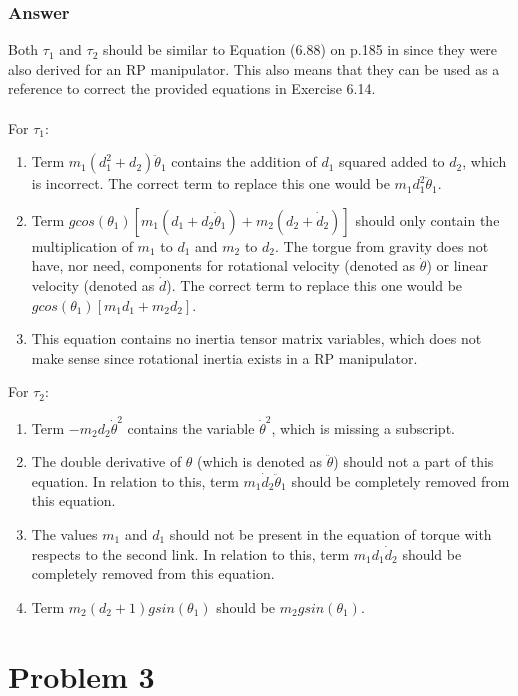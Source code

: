 \documentclass[10pt]{article}
\begin{document}
\subsubsection*{Answer}
Both \(\tau_{1}\) and \(\tau_{2}\) should be similar to Equation (6.88) on p.185 in \cite{textbook} since they were also derived for an RP manipulator. This also means that they can be used as a reference to correct the provided equations in Exercise 6.14. \\ \\
For \(\tau_{1}\):
\begin{enumerate}
\item Term \(m_{1}(d^{2}_{1} + d_{2})\ddot{\theta}_1\) contains the addition of \(d_{1}\) squared added to \(d_{2}\), which is incorrect. The correct term to replace this one would be \(m_{1}d^{2}_{1}\ddot{\theta}_1\).
\item Term \(g cos(\theta_{1})[m_{1}(d_{1} + d_{2}\dot{\theta}_{1}) + m_{2}(d_{2} + \dot{d}_{2})]\) should only contain the multiplication of \(m_{1}\) to \(d_{1}\) and \(m_{2}\) to \(d_{2}\). The torgue from gravity does not have, nor need, components for rotational velocity (denoted as \(\dot{\theta}\)) or linear velocity (denoted as \(\dot{d}\)). The correct term to replace this one would be \(g cos(\theta_{1})[m_{1}d_{1} + m_{2}d_{2}]\).
\item This equation contains no inertia tensor matrix variables, which does not make sense since rotational inertia exists in a RP manipulator.
\end{enumerate}
For \(\tau_{2}\):
\begin{enumerate}
\item Term \(- m_{2}d_{2}\dot{\theta}^2\) contains the variable \(\dot{\theta}^2\), which is missing a subscript.
\item The double derivative of \(\theta\) (which is denoted as \(\ddot{\theta}\)) should not a part of this equation. In relation to this, term \(m_{1}\dot{d}_{2}\ddot{\theta}_{1}\) should be completely removed from this equation.
\item The values \(m_{1}\) and \(d_{1}\) should not be present in the equation of torque with respects to the second link. In relation to this, term \(m_{1}d_{1}\dot{d}_2\) should be completely removed from this equation.
\item Term \(m_{2}(d_{2} + 1)g sin(\theta_{1})\) should be \(m_{2}g sin(\theta_{1})\).
\end{enumerate}
\pagebreak
\section*{Problem 3} %
\end{document}
